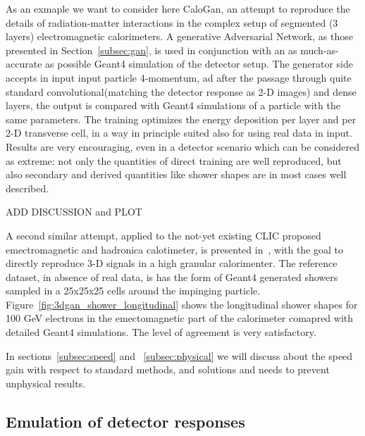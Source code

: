 As an exmaple we want to consider here CaloGan\cite{calogan}, an attempt to reproduce the details of radiation-matter interactions in the complex setup of segmented (3 layers) electromagnetic calorimeters.
A generative Adversarial Network, as those presented in Section~\ref{subsec:gan}, is used in conjunction with an as much-as-accurate as possible Geant4 simulation of the detector setup. The generator side accepts in input input particle 4-momentum, ad after the passage through quite standard convolutional(matching the detector response as 2-D images) and dense layers, the output is compared with Geant4 simulations of a particle with the same parameters.  The training optimizes the energy deposition per layer and per 2-D transverse cell, in a way in principle suited also for using real data in input. Results are very encouraging, even in a detector scenario which can be considered as extreme: not only the quantities of direct training are well reproduced, but also secondary and derived quantities like shower shapes are in most cases well described.

ADD DISCUSSION and PLOT



A second similar attempt, applied to the not-yet existing CLIC proposed emectromagnetic and hadronica calotimeter, is presented in~\cite{3dgan}, with the goal to directly reproduce 3-D signals in a high granular calorimenter. The reference dataset, in absence of real data, is has the form of Geant4 generated showers sampled in a 25x25x25 cells around the impinging particle.
Figure~\ref{fig:3dgan_shower_longitudinal} shows the longitudinal shower shapes for 100 GeV electrons in the emectomagnetic part of the calorimeter comapred with detailed Geant4 simulations. The level of agreement is very satisfactory.

In sections~\ref{subsec:speed} and ~\ref{subsec:physical} we will discuss about the speed gain with respect to standard methods, and solutions and needs to prevent unphysical results.

\subsection{Emulation of detector responses}
